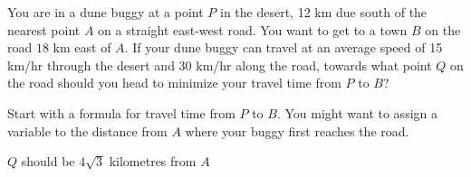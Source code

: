 \begin{Mquestion}[1999H, 2012H]\label{s3.5.3formulafirst}
You are in a dune buggy at a point $P$ in the desert, 12
km due south of the nearest point $A$ on a straight east-west road. You
want to get to a town $B$ on the road $18$ km east of $A$. If your dune
buggy can travel at an average speed of 15 km/hr through the desert and
30 km/hr along the road, towards what point $Q$ on the road should you
head to minimize your travel time from $P$ to $B$?

\begin{center}
\end{center}
\end{Mquestion}
\begin{hint} Start with a formula for travel time from $P$ to $B$. You might want to assign a variable to the distance from $A$ where your buggy first reaches the road.
\end{hint}
\begin{answer} $Q$ should be $4\sqrt{3}$ kilometres from $A$
\end{answer}
